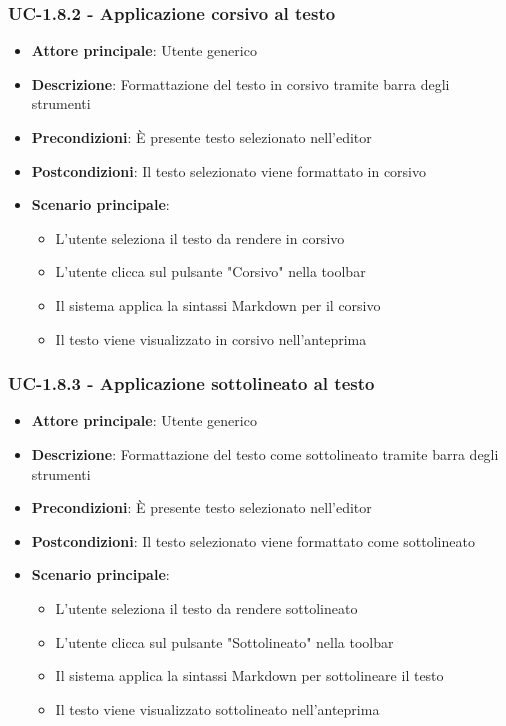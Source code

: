 \documentclass[11pt,a4paper]{article}
\begin{document}
\subsubsection{UC-1.8.2 - Applicazione corsivo al testo}
\begin{itemize}
    \item \textbf{Attore principale}: Utente generico
    \item \textbf{Descrizione}: Formattazione del testo in corsivo tramite barra degli strumenti
    \item \textbf{Precondizioni}: È presente testo selezionato nell'editor
    \item \textbf{Postcondizioni}: Il testo selezionato viene formattato in corsivo
    \item \textbf{Scenario principale}:
        \begin{itemize}
            \item L'utente seleziona il testo da rendere in corsivo
            \item L'utente clicca sul pulsante "Corsivo" nella toolbar
            \item Il sistema applica la sintassi Markdown per il corsivo
            \item Il testo viene visualizzato in corsivo nell'anteprima
        \end{itemize}
\end{itemize}

\subsubsection{UC-1.8.3 - Applicazione sottolineato al testo}
\begin{itemize}
    \item \textbf{Attore principale}: Utente generico
    \item \textbf{Descrizione}: Formattazione del testo come sottolineato tramite barra degli strumenti
    \item \textbf{Precondizioni}: È presente testo selezionato nell'editor
    \item \textbf{Postcondizioni}: Il testo selezionato viene formattato come sottolineato
    \item \textbf{Scenario principale}:
        \begin{itemize}
            \item L'utente seleziona il testo da rendere sottolineato
            \item L'utente clicca sul pulsante "Sottolineato" nella toolbar
            \item Il sistema applica la sintassi Markdown per sottolineare il testo
            \item Il testo viene visualizzato sottolineato nell'anteprima
        \end{itemize}
\end{itemize}
\end{document}
